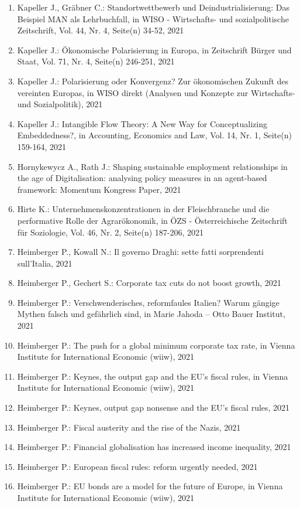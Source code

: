 \begin{enumerate}
	 \item Kapeller J., Gräbner C.: Standortwettbewerb und Deindustrialisierung: Das Beispiel MAN als Lehrbuchfall, in WISO - Wirtschafts- und sozialpolitische Zeitschrift, Vol. 44, Nr. 4, Seite(n) 34-52, 2021
	 \item Kapeller J.: Ökonomische Polarisierung in Europa, in Zeitschrift Bürger und Staat, Vol. 71, Nr. 4, Seite(n) 246-251, 2021
	 \item Kapeller J.: Polarisierung oder Konvergenz? Zur ökonomischen Zukunft des vereinten Europas, in WISO direkt (Analysen und Konzepte zur Wirtschafts- und Sozialpolitik), 2021
	 \item Kapeller J.: Intangible Flow Theory: A New Way for Conceptualizing Embeddedness?, in Accounting, Economics and Law, Vol. 14, Nr. 1, Seite(n) 159-164, 2021
	 \item Hornykewycz A., Rath J.: Shaping sustainable employment relationships in the age of Digitalisation: analysing policy measures in an agent-based framework: Momentum Kongress Paper, 2021
	 \item Hirte K.: Unternehmenskonzentrationen in der Fleischbranche und die performative Rolle der Agrarökonomik, in ÖZS - Österreichische Zeitschrift für Soziologie, Vol. 46, Nr. 2, Seite(n) 187-206, 2021
	 \item Heimberger P., Kowall N.: Il governo Draghi: sette fatti sorprendenti sull’Italia, 2021
	 \item Heimberger P., Gechert S.: Corporate tax cuts do not boost growth, 2021
	 \item Heimberger P.: Verschwenderisches, reformfaules Italien? Warum gängige Mythen falsch und gefährlich sind, in Marie Jahoda – Otto Bauer Institut, 2021
	 \item Heimberger P.: The push for a global minimum corporate tax rate, in Vienna Institute for International Economic (wiiw), 2021
	 \item Heimberger P.: Keynes, the output gap and the EU’s fiscal rules, in Vienna Institute for International Economic (wiiw), 2021
	 \item Heimberger P.: Keynes, output gap nonsense and the EU’s fiscal rules, 2021
	 \item Heimberger P.: Fiscal austerity and the rise of the Nazis, 2021
	 \item Heimberger P.: Financial globalisation has increased income inequality, 2021
	 \item Heimberger P.: European fiscal rules: reform urgently needed, 2021
	 \item Heimberger P.: EU bonds are a model for the future of Europe, in Vienna Institute for International Economic (wiiw), 2021

\end{enumerate}
